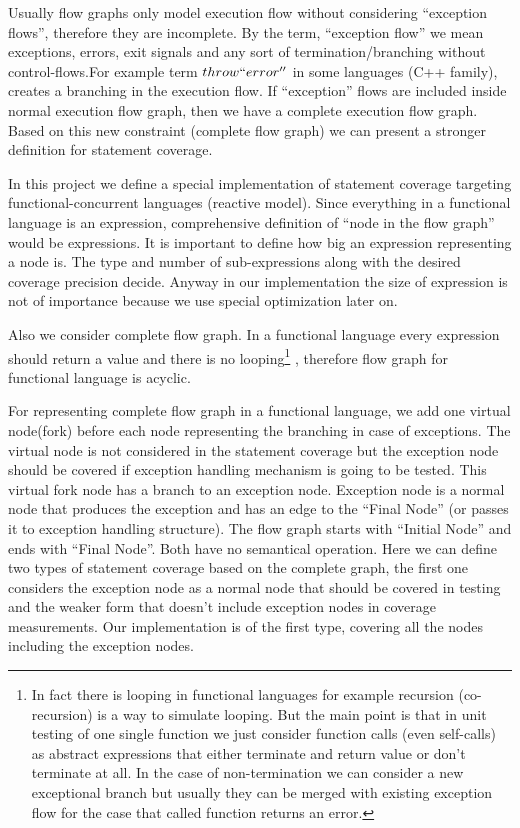 \documentclass[12pt,a4paper]{report}
\begin{document}
Usually flow graphs only model execution flow without considering ``exception flows'', therefore they are incomplete. By the term, ``exception flow'' we
 mean exceptions, errors, exit signals and any sort of termination/branching without control-flows.For example term $throw ``error''$ in some languages
 (C++ family), creates a branching in the execution flow. If ``exception'' flows are included inside normal execution flow graph, then we have a complete
 execution flow graph. Based on this new constraint (complete flow graph) we can present a stronger definition for statement coverage. 

In this project we define a special implementation of statement coverage targeting functional-concurrent languages (reactive model). Since everything in a
 functional language is an expression, comprehensive definition of “node in the flow graph” would be expressions. It is important to define how big an
 expression representing a node is. The type and number of sub-expressions along with the desired coverage precision decide. Anyway in our implementation
 the size of expression is not of importance because we use special optimization later on.  
 
Also we consider complete flow graph.
 In a functional language every expression should return a value and there is no looping\footnote{In fact there is looping in functional languages for 
example recursion (co-recursion) is a way to simulate looping. But the main point is that in unit testing of one single function we just consider function
 calls (even self-calls) as abstract expressions that either terminate and return value or don't terminate at all. In the case of non-termination we can
 consider a new exceptional branch but usually they can be merged with existing exception flow for the case that called function returns an error.}
, therefore flow graph for functional language is acyclic.

For representing complete flow graph in a functional language, we add one virtual node(fork) before each node representing the branching in case of
 exceptions. The virtual node is not considered in the statement coverage but the exception node should be covered if exception handling mechanism
 is going to be tested. This virtual fork node has a branch to an exception
node. Exception node is a normal node that produces the exception and has an edge to the ``Final Node'' (or passes it to exception handling structure).
The flow graph starts with ``Initial Node'' and ends with ``Final Node''. Both have no semantical operation. Here we can define two types of
 statement coverage based on the complete graph, the first one considers the exception node as a normal node that should be covered in testing and the
 weaker form that doesn't include exception nodes in coverage measurements. Our implementation is of the first type, covering all the nodes including the 
exception nodes.
\end{document}
